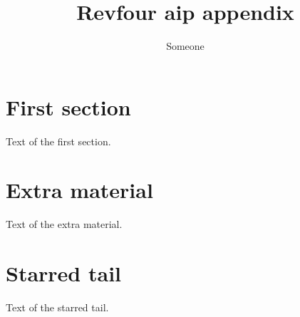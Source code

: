 \documentclass[aip]{revtex4}
\begin{document}
\title{Revfour aip appendix}
\author{Someone}
\maketitle
\section{First section}
Text of the first section.
\appendix*
\section[Extra]{Extra material}
Text of the extra material.
\section*{Starred tail}
Text of the starred tail.
\end{document}
